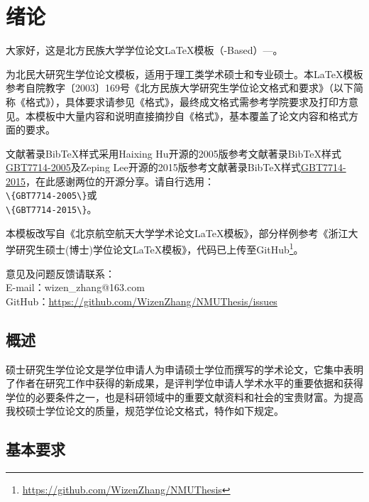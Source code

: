 \chapter{绪论}
大家好，这是北方民族大学学位论文\LaTeX{}模板（\CTeX{}-Based）---\NMUThesis{}。

\NMUThesis{}为北民大研究生学位论文模板，适用于理工类学术硕士和专业硕士。本\LaTeX{}模板参考自院教字〔2003〕169号《北方民族大学研究生学位论文格式和要求》（以下简称《格式》），具体要求请参见《格式》，最终成文格式需参考学院要求及打印方意见。本模板中大量内容和说明直接摘抄自《格式》，基本覆盖了论文内容和格式方面的要求。

文献著录BibTeX样式采用Haixing Hu开源的2005版参考文献著录BibTeX样式\href{https://github.com/Haixing-Hu/GBT7714-2005-BibTeX-Style}{GBT7714-2005}及Zeping Lee开源的2015版参考文献著录BibTeX样式\href{https://github.com/zepinglee/gbt7714-bibtex-style}{GBT7714-2015}，在此感谢两位的开源分享。请自行选用：\\
\verb|\{GBT7714-2005\}|或\\
\verb|\{GBT7714-2015\}|。

本模板改写自《北京航空航天大学学术论文\LaTeX{}模板》，部分样例参考《浙江大学研究生硕士(博士)学位论文\LaTeX{}模板》，代码已上传至GitHub\footnote{\href{https://github.com/WizenZhang/NMUThesis}{https://github.com/WizenZhang/NMUThesis}}。

意见及问题反馈请联系：\\
\indent E-mail：wizen\_zhang@163.com\\
\indent GitHub：\href{https://github.com/WizenZhang/NMUThesis/issues}{https://github.com/WizenZhang/NMUThesis/issues}

\section{概述}
硕士研究生学位论文是学位申请人为申请硕士学位而撰写的学术论文，它集中表明了作者在研究工作中获得的新成果，是评判学位申请人学术水平的重要依据和获得学位的必要条件之一，也是科研领域中的重要文献资料和社会的宝贵财富。为提高我校硕士学位论文的质量，规范学位论文格式，特作如下规定。

\section{基本要求}

